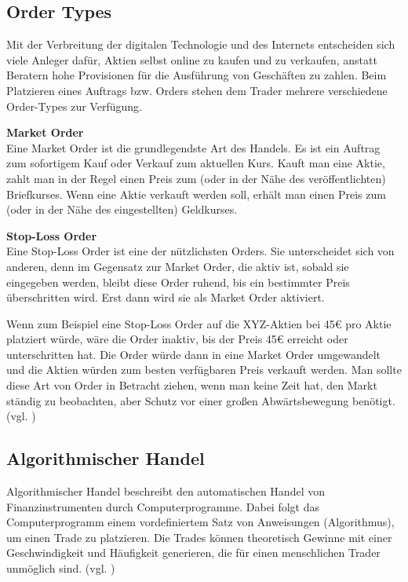 \documentclass[oneside]{ausarbeitung}
\begin{document}
\subsection{Order Types}
\label{sub:Order Types}

Mit der Verbreitung der digitalen Technologie und des Internets entscheiden sich viele Anleger dafür, Aktien selbst online zu kaufen und zu verkaufen, anstatt Beratern hohe Provisionen für die Ausführung von Geschäften zu zahlen. Beim Platzieren eines Auftrags bzw. Orders stehen dem Trader mehrere verschiedene Order-Types zur Verfügung.

\textbf{Market Order} \\
Eine Market Order ist die grundlegendste Art des Handels. Es ist ein Auftrag zum sofortigem Kauf oder Verkauf zum aktuellen Kurs. Kauft man eine Aktie, zahlt man in der Regel einen Preis zum (oder in der Nähe des veröffentlichten) Briefkurses. Wenn eine Aktie verkauft werden soll, erhält man einen Preis zum (oder in der Nähe des eingestellten) Geldkurses.

\textbf{Stop-Loss Order} \\
Eine Stop-Loss Order ist eine der nützlichsten Orders. Sie unterscheidet sich von anderen, denn im Gegensatz zur Market Order, die aktiv ist, sobald sie eingegeben werden, bleibt diese Order ruhend, bis ein bestimmter Preis überschritten wird. Erst dann wird sie als Market Order aktiviert.

Wenn zum Beispiel eine Stop-Loss Order auf die XYZ-Aktien bei 45€ pro Aktie platziert würde, wäre die Order inaktiv, bis der Preis 45€ erreicht oder unterschritten hat. Die Order würde dann in eine Market Order umgewandelt und die Aktien würden zum besten verfügbaren Preis verkauft werden. Man sollte diese Art von Order in Betracht ziehen, wenn man keine Zeit hat, den Markt ständig zu beobachten, aber Schutz vor einer großen Abwärtsbewegung benötigt. (vgl. \cite{order_types})

\subsection{Algorithmischer Handel}
\label{sub:algorithmischer_handel}

Algorithmischer Handel beschreibt den automatischen Handel von
Finanzinstrumenten durch Computerprogramme. Dabei folgt das
Computerprogramm einem vordefiniertem Satz von Anweisungen
(Algorithmus), um einen Trade zu platzieren. Die Trades können
theoretisch Gewinne mit einer Geschwindigkeit und Häufigkeit
generieren, die für einen menschlichen Trader unmöglich sind. (vgl.
\cite{algorithmic_trading})
\end{document}
